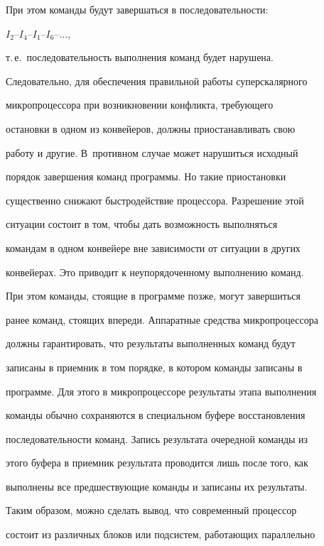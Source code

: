 При этом команды будут завершаться в последовательности:


$


I_2\mbox{--}I_4\mbox{--}I_1\mbox{--}I_6\mbox{--}\ldots


$,


т.\,е.\ последовательность выполнения команд будет нарушена.





Следовательно, для обеспечения правильной работы суперскалярного 


мик\-ро\-про\-цес\-со\-ра при возникновении конфликта, требующего 


остановки  в одном из конвейеров, должны приостанавливать свою 


работу и другие. В~противном случае может нарушиться исходный 


порядок завершения команд программы. Но такие приостановки 


существенно снижают быстродействие процессора. Разрешение этой 


ситуации состоит в том, чтобы дать возможность выполняться 


командам в одном конвейере вне зависимости от ситуации в других 


конвейерах. Это приводит к неупорядоченному выполнению команд. 


При этом команды, стоящие в программе позже, могут завершиться 


ранее команд, стоящих впереди. Аппаратные средства микропроцессора 


должны гарантировать, что результаты выполненных команд будут 


записаны в приемник в том порядке, в котором команды записаны в 


программе. Для этого в микропроцессоре результаты этапа выполнения 


команды обычно сохраняются в специальном буфере восстановления 


последовательности команд. Запись результата очередной команды из 


этого буфера в приемник результата проводится лишь после того, как 


выполнены все предшествующие команды и записаны их результаты.


 


 Таким образом, можно сделать вывод, что современный процессор 


состоит из различных блоков или подсистем, работающих параллельно 


